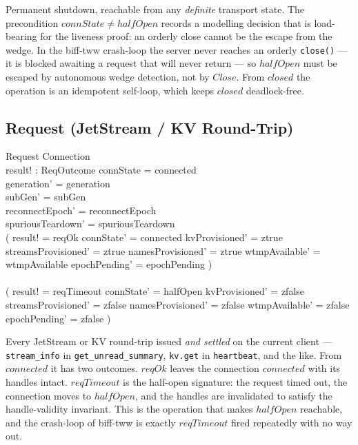 \documentclass[a4paper,10pt,fleqn]{article}
\begin{document}
Permanent shutdown, reachable from any \emph{definite} transport
state.  The precondition $connState \neq halfOpen$ records a
modelling decision that is load-bearing for the liveness proof:
an orderly close cannot be the escape from the wedge.  In the
biff-tww crash-loop the server never reaches an orderly
\texttt{close()} --- it is blocked awaiting a request that will
never return --- so $halfOpen$ must be escaped by autonomous
wedge detection, not by $Close$.  From $closed$ the operation is
an idempotent self-loop, which keeps $closed$ deadlock-free.

\subsection{Request (JetStream / KV Round-Trip)}

\begin{schema}{Request}
  \Delta Connection \\
  result! : ReqOutcome
  \where
  connState = connected \\
  generation' = generation \\
  subGen' = subGen \\
  reconnectEpoch' = reconnectEpoch \\
  spuriousTeardown' = spuriousTeardown \\
  ( result! = reqOk \land
    connState' = connected \land
    kvProvisioned' = ztrue \land
    streamsProvisioned' = ztrue \land
    namesProvisioned' = ztrue \land
    wtmpAvailable' = wtmpAvailable \land
    epochPending' = epochPending ) \\
  \lor \\
  ( result! = reqTimeout \land
    connState' = halfOpen \land
    kvProvisioned' = zfalse \land
    streamsProvisioned' = zfalse \land
    namesProvisioned' = zfalse \land
    wtmpAvailable' = zfalse \land
    epochPending' = zfalse )
\end{schema}

Every JetStream or KV round-trip issued \emph{and settled} on the
current client --- \texttt{stream\_info} in
\texttt{get\_unread\_summary}, \texttt{kv.get} in
\texttt{heartbeat}, and the like.  From $connected$ it has two
outcomes.  $reqOk$ leaves the connection $connected$ with its
handles intact.  $reqTimeout$ is the half-open signature: the
request timed out, the connection moves to $halfOpen$, and the
handles are invalidated to satisfy the handle-validity invariant.
This is the operation that makes $halfOpen$ reachable, and the
crash-loop of biff-tww is exactly $reqTimeout$ fired repeatedly
with no way out.
\end{document}
